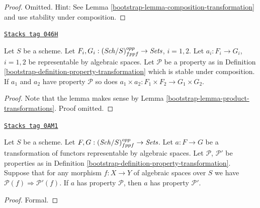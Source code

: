 \begin{proof}

Omitted. Hint: See
Lemma \ref{bootstrap-lemma-composition-transformation}
and use stability under composition.
\end{proof}

\begin{lemma}
\label{bootstrap-lemma-product-transformations-property}
\href{https://stacks.math.columbia.edu/tag/046H}{\texttt{Stacks tag 046H}}

Let $S$ be a scheme.
Let $F_i, G_i : (\mathit{Sch}/S)_{fppf}^{opp} \to \textit{Sets}$,
$i = 1, 2$.
Let $a_i : F_i \to G_i$, $i = 1, 2$ be representable by algebraic spaces.
Let $\mathcal{P}$ be a property as in
Definition \ref{bootstrap-definition-property-transformation}
which is stable under composition.
If $a_1$ and $a_2$ have property $\mathcal{P}$ so does
$a_1 \times a_2 : F_1 \times F_2 \longrightarrow G_1 \times G_2$.
\end{lemma}

\begin{proof}

Note that the lemma makes sense by
Lemma \ref{bootstrap-lemma-product-transformations}.
Proof omitted.
\end{proof}

\begin{lemma}
\label{bootstrap-lemma-transformations-property-implication}
\href{https://stacks.math.columbia.edu/tag/0AM1}{\texttt{Stacks tag 0AM1}}

Let $S$ be a scheme.
Let $F, G : (\mathit{Sch}/S)_{fppf}^{opp} \to \textit{Sets}$.
Let $a : F \to G$ be a transformation of functors representable by
algebraic spaces.
Let $\mathcal{P}$, $\mathcal{P}'$ be properties as in
Definition \ref{bootstrap-definition-property-transformation}.
Suppose that for any morphism $f : X \to Y$ of algebraic spaces over $S$
we have $\mathcal{P}(f) \Rightarrow \mathcal{P}'(f)$.
If $a$ has property $\mathcal{P}$, then
$a$ has property $\mathcal{P}'$.
\end{lemma}

\begin{proof}
Formal.
\end{proof}


